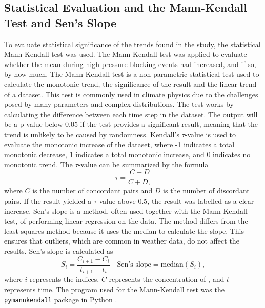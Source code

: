 \subsection{Statistical Evaluation and the Mann-Kendall Test and Sen's Slope}
To evaluate statistical significance of the trends found in the study, the statistical Mann-Kendall test was used. The Mann-Kendall test was applied to evaluate whether the \PM mean during high-pressure blocking events had increased, and if so, by how much. The Mann-Kendall test is a non-parametric statistical test used to calculate the monotonic trend, the significance of the result and the linear trend of a dataset. This test is commonly used in climate physics due to the challenges posed by many parameters and complex distributions. The test works by calculating the difference between each time step in the dataset. The output will be a p-value below 0.05 if the test provides a significant result, meaning that the trend is unlikely to be caused by randomness. Kendall's $\tau$-value is used to evaluate the monotonic increase of the dataset, where -1 indicates a total monotonic decrease, 1 indicates a total monotonic increase, and 0 indicates no monotonic trend. The $\tau$-value can be summarized by the formula 
\begin{equation}
    \tau = \frac{C - D}{C + D,}
    \label{eq:Kendalltau}
\end{equation}
where $C$ is the number of concordant pairs and $D$ is the number of discordant pairs. If the result yielded a $\tau$-value above 0.5, the result was labelled as a clear increase. Sen's slope is a method, often used together with the Mann-Kendall test, of performing linear regression on the data. The method differs from the least squares method because it uses the median to calculate the slope. This ensures that outliers, which are common in weather data, do not affect the results. Sen's slope is calculated as 
\begin{equation}
    S_{i} = \frac{C_{i+1} - C_i}{t_{i+1} - t_i} \quad \text{Sen's slope} = \text{median}(S_{i}),
    \label{eq:Senslope}
\end{equation}
where $i$ represents the indices, $C$ represents the concentration of \PM, and $t$ represents time. The program used for the Mann-Kendall test was the \texttt{pymannkendall} package in Python \cite{hussainmd.PyMannKendallPythonPackage2019}.
